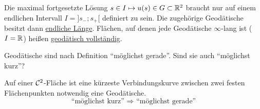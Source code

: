 \begin{bemerkung}
 Die maximal fortgesetzte Lösung  \(s \in I \mapsto u(s) \in G \subset \mathbb{R}^2\) braucht nur auf einem endlichen Intervall \(I = ]s_{-}; s_{+}[\) definiert zu sein. Die zugehörige Geodätische besitzt dann \uline{endliche Länge}. Flächen, auf denen jede Geodätische \(\infty\)-lang ist (\(I = \mathbb{R}\)) heißen \uline{geodätisch vollständig}.
\end{bemerkung}

Geodätische sind nach Definition ``möglichst gerade''. Sind sie auch ``möglichst kurz''?

\begin{satz}\label{satz223}
 Auf einer \(\mathcal{C}^2\)-Fläche ist eine kürzeste Verbindungskurve zwischen zwei festen Flächenpunkten notwendig eine Geodätische.
 \[
  \text{``möglichst kurz'' } \Rightarrow \text{ ``möglichst gerade''}
 \]
\end{satz}

